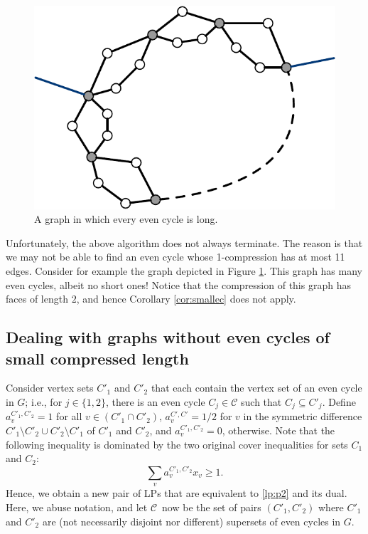 \documentclass{article}
\newcommand{\C}{\ensuremath{\mathcal{C}}}
\newcommand{\0}{\mathbb{0}}
\newcommand{\1}{\mathbb{1}}
\begin{document}
\begin{figure}
  \begin{center}
    \includegraphics[width=.3\textwidth]{longcyc.pdf}
  \end{center}
  \caption{\label{fig:longcyc} A graph in which every even cycle is long.}
\end{figure}

Unfortunately, the above algorithm does not always terminate. The
reason is that we may not be able to find an even cycle whose
1-compression has at most 11 edges. Consider for example the 
graph depicted in Figure \ref{fig:longcyc}. This graph has many even
cycles, albeit no short ones! Notice that the compression of this
graph has faces of length $2$, and hence Corollary \ref{cor:smallec}
does not apply. 

\subsection{Dealing with graphs without even cycles of small
  compressed length}

Consider vertex sets $C'_1$ and $C'_2$ that each contain the  vertex set of an even cycle
in $G$; i.e., for $j \in \{1,2\}$, there is an even cycle $C_j \in \C$ such that $C_j
\subseteq C'_j$. 
Define $a_v^{C'_1,C'_2}=1$
for all $v \in (C'_1 \cap C'_2)$, $a_v^{C',C'}=1/2$ for
$v$ in the symmetric difference $C'_1\setminus C'_2 \cup C'_2 \setminus C'_1$
of $C'_1$ and $C'_2$, and
$a_v^{C'_1,C'_2}=0$, otherwise. Note that the following inequality is
dominated by the two original cover inequalities for
sets $C_1$ and $C_2$:
\[ \sum_{v} a^{C'_1,C'_2}_v x_v \geq 1. \]
Hence, we obtain a new
pair of LPs that are equivalent to \eqref{lp:p2} and its
dual. Here, we abuse notation, and let \C\ now be the set of pairs $(C'_1,C'_2)$ where
$C'_1$ and $C'_2$ are (not necessarily disjoint nor different) 
supersets of even cycles in $G$.

\medskip
\end{document}
